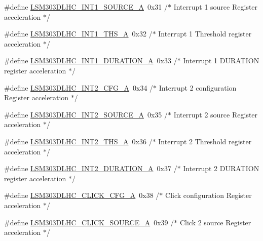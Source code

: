 \begin{DoxyCompactItemize}
\item 
\#define \hyperlink{group__STM32F3__DISCOVERY__LSM303DLHC__Exported__Constants_gaae8de2160983c3475d3dbc17d4d420da}{L\+S\+M303\+D\+L\+H\+C\+\_\+\+I\+N\+T1\+\_\+\+S\+O\+U\+R\+C\+E\+\_\+\+A}~0x31  /$\ast$ Interrupt 1 source Register acceleration $\ast$/
\item 
\#define \hyperlink{group__STM32F3__DISCOVERY__LSM303DLHC__Exported__Constants_ga807ede9222b19a230ba26c81cf1d6392}{L\+S\+M303\+D\+L\+H\+C\+\_\+\+I\+N\+T1\+\_\+\+T\+H\+S\+\_\+\+A}~0x32  /$\ast$ Interrupt 1 Threshold register acceleration $\ast$/
\item 
\#define \hyperlink{group__STM32F3__DISCOVERY__LSM303DLHC__Exported__Constants_ga5d343a69608f10da64ff9970ba22632c}{L\+S\+M303\+D\+L\+H\+C\+\_\+\+I\+N\+T1\+\_\+\+D\+U\+R\+A\+T\+I\+O\+N\+\_\+\+A}~0x33  /$\ast$ Interrupt 1 D\+U\+R\+A\+T\+I\+O\+N register acceleration $\ast$/
\item 
\#define \hyperlink{group__STM32F3__DISCOVERY__LSM303DLHC__Exported__Constants_gaf89921cef1a74c116b5ff0636d0a4ad3}{L\+S\+M303\+D\+L\+H\+C\+\_\+\+I\+N\+T2\+\_\+\+C\+F\+G\+\_\+\+A}~0x34  /$\ast$ Interrupt 2 configuration Register acceleration $\ast$/
\item 
\#define \hyperlink{group__STM32F3__DISCOVERY__LSM303DLHC__Exported__Constants_ga63c76649a348089a54bbe208a05c6d89}{L\+S\+M303\+D\+L\+H\+C\+\_\+\+I\+N\+T2\+\_\+\+S\+O\+U\+R\+C\+E\+\_\+\+A}~0x35  /$\ast$ Interrupt 2 source Register acceleration $\ast$/
\item 
\#define \hyperlink{group__STM32F3__DISCOVERY__LSM303DLHC__Exported__Constants_ga22105c8aefe912f0c28593231646dc8f}{L\+S\+M303\+D\+L\+H\+C\+\_\+\+I\+N\+T2\+\_\+\+T\+H\+S\+\_\+\+A}~0x36  /$\ast$ Interrupt 2 Threshold register acceleration $\ast$/
\item 
\#define \hyperlink{group__STM32F3__DISCOVERY__LSM303DLHC__Exported__Constants_ga73ed12b9704e4081c171289eca73c79e}{L\+S\+M303\+D\+L\+H\+C\+\_\+\+I\+N\+T2\+\_\+\+D\+U\+R\+A\+T\+I\+O\+N\+\_\+\+A}~0x37  /$\ast$ Interrupt 2 D\+U\+R\+A\+T\+I\+O\+N register acceleration $\ast$/
\item 
\#define \hyperlink{group__STM32F3__DISCOVERY__LSM303DLHC__Exported__Constants_ga4b1a0ba5d0b104eb2cde6c851beb816c}{L\+S\+M303\+D\+L\+H\+C\+\_\+\+C\+L\+I\+C\+K\+\_\+\+C\+F\+G\+\_\+\+A}~0x38  /$\ast$ Click configuration Register acceleration $\ast$/
\item 
\#define \hyperlink{group__STM32F3__DISCOVERY__LSM303DLHC__Exported__Constants_ga11e20a48eded690db7fea506d13ffa6b}{L\+S\+M303\+D\+L\+H\+C\+\_\+\+C\+L\+I\+C\+K\+\_\+\+S\+O\+U\+R\+C\+E\+\_\+\+A}~0x39  /$\ast$ Click 2 source Register acceleration $\ast$/

\end{DoxyCompactItemize}
